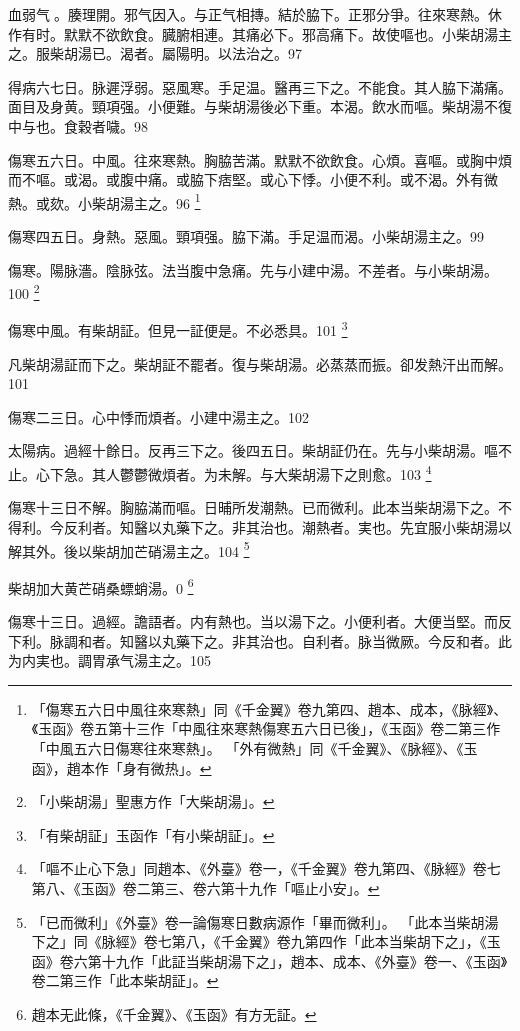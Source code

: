 血弱气{\sungtpii 𥁞}。腠理開。邪气因入。与正气相摶。結於脇下。正邪分爭。往來寒熱。休作有时。默默不欲飲食。臓腑相連。其痛必下。邪高痛下。故使嘔也。小柴胡湯主之。服柴胡湯已。渴者。屬陽明。以法治之。97

得病六七日。脉遲浮弱。惡風寒。手足温。醫再三下之。不能食。其人脇下滿{\khaaitp 痛}。面目及身黄。頸項强。小便難。与柴胡湯後必下重。本渴。飲水而嘔。柴胡{\khaaitp 湯}不復中与也。食穀者噦。98

傷寒五六日。中風。往來寒熱。胸脇苦滿。默默不欲飲食。心煩。喜嘔。或胸中煩而不嘔。或渴。或腹中痛。或脇下痞堅。或心下悸。小便不利。或不渴。外有微熱。或欬。小柴胡湯主之。96
	\footnote{
		「傷寒五六日中風往來寒熱」同《千金翼》卷九第四、趙本、成本，《脉經》、《玉函》卷五第十三作「中風往來寒熱傷寒五六日已後」，《玉函》卷二第三作「中風五六日傷寒往來寒熱」。
		「外有微熱」同《千金翼》、《脉經》、《玉函》，趙本作「身有微热」。
	}

傷寒四五日。身熱。惡風。頸項强。脇下滿。手足温而渴。小柴胡湯主之。99

傷寒。陽脉濇。陰脉弦。法当腹中急痛。先与小建中湯。不差者。与小柴胡湯。100
	\footnote{
	「小柴胡湯」聖惠方作「大柴胡湯」。
	}

傷寒中風。有柴胡証。但見一証便是。不必悉具。101
	\footnote{
	「有柴胡証」玉函作「有小柴胡証」。
	}

凡柴胡湯証而下之。柴胡証不罷者。復与柴胡湯。必蒸蒸而振。卻发熱汗出而解。101

傷寒二三日。心中悸而煩者。小建中湯主之。102

太陽病。過經十餘日。反再三下之。後四五日。柴胡証仍在。先与小柴胡湯。嘔不止。心下急。其人鬱鬱微煩者。为未解。与大柴胡湯下之則愈。103
	\footnote{
		「嘔不止心下急」同趙本、《外臺》卷一，《千金翼》卷九第四、《脉經》卷七第八、《玉函》卷二第三、卷六第十九作「嘔止小安」。
	}

傷寒十三日不解。胸脇滿而嘔。日晡所发潮熱{\khaaitp 。已}而微利。此本当柴胡湯下之。不得利。今反利者。知醫以丸藥下之。非其治也。潮熱者。実也。先宜服小柴胡湯以解其外。後以柴胡加芒硝湯主之。104
	\footnote{
	「已而微利」《外臺》卷一論傷寒日數病源作「畢而微利」。
	「此本当柴胡湯下之」同《脉經》卷七第八，《千金翼》卷九第四作「此本当柴胡下之」，《玉函》卷六第十九作「此証当柴胡湯下之」，趙本、成本、《外臺》卷一、《玉函》卷二第三作「此本柴胡証」。
	}

柴胡加大黄芒硝桑螵蛸湯。0
	\footnote{
		趙本无此條，《千金翼》、《玉函》有方无証。
	}

傷寒十三日。過經。譫語者。内有熱也。当以湯下之。小便利者。大便当堅。而反{\khaaitp 下}利。脉調和者。知醫以丸藥下之。非其治也。自利者。脉当微厥。今反和者。此为内実也。{\khaaitp 調胃}承气湯主之。105

